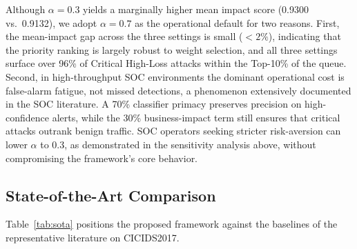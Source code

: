 \documentclass[conference]{IEEEtran}
\begin{document}
 Although $\alpha = 0.3$ yields a marginally higher mean impact score 
(0.9300 vs.\ 0.9132), we adopt $\alpha = 0.7$ as the operational 
default for two reasons. First, the mean-impact gap across the three 
settings is small ($< 2\%$), indicating that the priority ranking is 
largely robust to weight selection, and all three settings surface 
over 96\% of Critical High-Loss attacks within the Top-10\% of the 
queue. Second, in high-throughput SOC environments the dominant 
operational cost is false-alarm fatigue, not missed detections, a 
phenomenon extensively documented in the SOC literature. A 70\% 
classifier primacy preserves precision on high-confidence alerts, 
while the 30\% business-impact term still ensures that critical 
attacks outrank benign traffic. SOC operators seeking stricter 
risk-aversion can lower $\alpha$ to 0.3, as demonstrated in the 
sensitivity analysis above, without compromising the framework's 
core behavior.

\subsection{State-of-the-Art Comparison}
Table~\ref{tab:sota} positions the proposed framework against the baselines of the representative literature on CICIDS2017.

\begin{table}[htbp]
\centering
\caption{Comparative capability and performance against representative literature baselines. Baseline F1 values are reported as published in the original papers; the Proposed row reflects our evaluation on the de-duplicated CICIDS2017 partition.}
\label{tab:sota}
\end{table}
\end{document}
